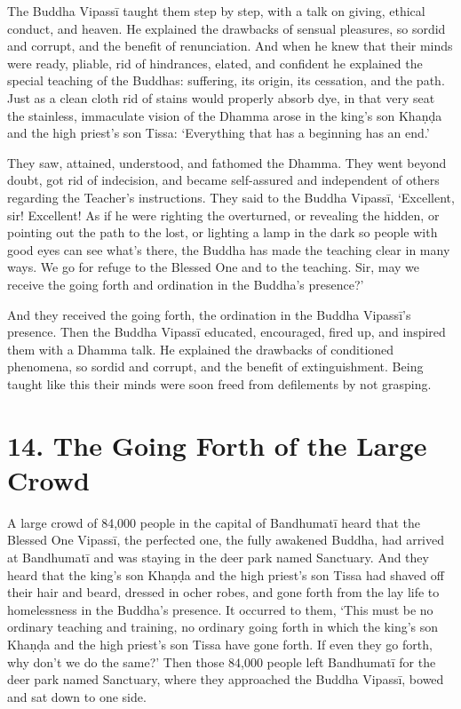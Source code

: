 \documentclass[12pt,openany]{book}%
\begin{document}
The Buddha \textsanskrit{Vipassī} taught them step by step, with a talk on giving, ethical conduct, and heaven. He explained the drawbacks of sensual pleasures, so sordid and corrupt, and the benefit of renunciation. And when he knew that their minds were ready, pliable, rid of hindrances, elated, and confident he explained the special teaching of the Buddhas: suffering, its origin, its cessation, and the path. Just as a clean cloth rid of stains would properly absorb dye, in that very seat the stainless, immaculate vision of the Dhamma arose in the king’s son \textsanskrit{Khaṇḍa} and the high priest’s son Tissa: ‘Everything that has a beginning has an end.’ 

They saw, attained, understood, and fathomed the Dhamma. They went beyond doubt, got rid of indecision, and became self-assured and independent of others regarding the Teacher’s instructions. They said to the Buddha \textsanskrit{Vipassī}, ‘Excellent, sir! Excellent! As if he were righting the overturned, or revealing the hidden, or pointing out the path to the lost, or lighting a lamp in the dark so people with good eyes can see what’s there, the Buddha has made the teaching clear in many ways. We go for refuge to the Blessed One and to the teaching. Sir, may we receive the going forth and ordination in the Buddha’s presence?’ 

And they received the going forth, the ordination in the Buddha \textsanskrit{Vipassī}’s presence. Then the Buddha \textsanskrit{Vipassī} educated, encouraged, fired up, and inspired them with a Dhamma talk. He explained the drawbacks of conditioned phenomena, so sordid and corrupt, and the benefit of extinguishment. Being taught like this their minds were soon freed from defilements by not grasping. 

\section*{14. The Going Forth of the Large Crowd }

A large crowd of 84,000 people in the capital of \textsanskrit{Bandhumatī} heard that the Blessed One \textsanskrit{Vipassī}, the perfected one, the fully awakened Buddha, had arrived at \textsanskrit{Bandhumatī} and was staying in the deer park named Sanctuary. And they heard that the king’s son \textsanskrit{Khaṇḍa} and the high priest’s son Tissa had shaved off their hair and beard, dressed in ocher robes, and gone forth from the lay life to homelessness in the Buddha’s presence. It occurred to them, ‘This must be no ordinary teaching and training, no ordinary going forth in which the king’s son \textsanskrit{Khaṇḍa} and the high priest’s son Tissa have gone forth. If even they go forth, why don’t we do the same?’ Then those 84,000 people left \textsanskrit{Bandhumatī} for the deer park named Sanctuary, where they approached the Buddha \textsanskrit{Vipassī}, bowed and sat down to one side. 
\end{document}
